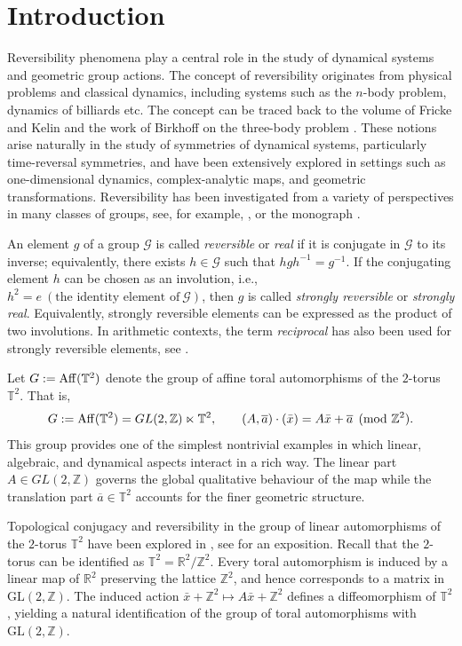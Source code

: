 \documentclass[12pt]{amsart}
\theoremstyle{plain}
\theoremstyle{definition}
\theoremstyle{remark}
\begin{document}
\section{Introduction}\label{intro}

Reversibility phenomena play a central role in the study of dynamical systems and geometric group actions. The concept of reversibility originates from physical problems and classical dynamics, including systems such as the $n$-body problem, dynamics of billiards etc. The concept can be traced back to the volume of Fricke and Kelin \cite{FK}  and the work of Birkhoff on the three-body problem \cite{GB}. These notions arise naturally in the study of symmetries of dynamical systems, particularly time-reversal symmetries, and have been extensively explored in settings such as one-dimensional dynamics, complex-analytic maps, and geometric transformations. Reversibility has been investigated from a variety of perspectives in many classes of groups,  see, for example, \cite{ATW, BR, dc, Dj, dhs, DGL, El, GM,  OFa, Sa, Sh1, ST,  Wo}, or the monograph \cite{IS}. 

An element $ g$  of a group $ \mathcal G$  is called \emph{reversible} or \emph{real} if it is conjugate in $\mathcal G$  to its inverse; equivalently,
there exists $ h\in \mathcal G$  such that $hgh^{-1}=g^{-1}$. 
If the conjugating element $h$  can be chosen as an involution, i.e.,~$h^2=e~(\text{the identity element of}~\mathcal{G})$, then $ g$ 
is called \emph{strongly reversible} or \emph{strongly real}. Equivalently, strongly reversible elements can be expressed as the product of two involutions. In arithmetic contexts, the term \emph{reciprocal} has also been used for strongly reversible elements, see \cite{bv, dg, Sa}. 

Let $G:={\rm Aff}(\mathbb T^{2})$ denote the group of affine toral automorphisms of the $2$-torus $\mathbb T^{2}$. That is, 
\[ G:= {\rm Aff}(\mathbb T^{2})
   = GL(2,\mathbb Z)\ltimes \mathbb T^{2},\qquad
(A,\overline{a})\cdot(\bar{x})=A\bar{x}+\overline{a} \pmod{\mathbb Z^{2}}. 
\]
This group provides one of the simplest nontrivial examples in which linear, algebraic, and
dynamical aspects interact in a rich way.  The linear part $ A\in GL(2,\mathbb Z)$ 
governs the global qualitative behaviour of the map while the translation part $ \overline{a}\in\mathbb T^{2}$  accounts for the finer geometric structure.  

Topological conjugacy and reversibility in the group of linear automorphisms of the $2$-torus $\mathbb{T}^{2}$ have been explored in \cite{ATW, BR2}, see \cite{IS} for an exposition. Recall that the $2$-torus can be identified as  $\mathbb{T}^2 = \mathbb{R}^2 / \mathbb{Z}^2$. Every toral automorphism is induced by a linear map of $\mathbb{R}^2$ preserving the lattice $\mathbb{Z}^2$, and hence corresponds to a matrix in $\mathrm{GL}(2,\mathbb{Z})$. The induced action $\bar{x} + \mathbb{Z}^2 \mapsto A\bar{x} + \mathbb{Z}^2$ defines a diffeomorphism of $\mathbb{T}^2$, yielding a natural identification of the group of toral automorphisms with $\mathrm{GL}(2,\mathbb{Z})$. 
\end{document}
